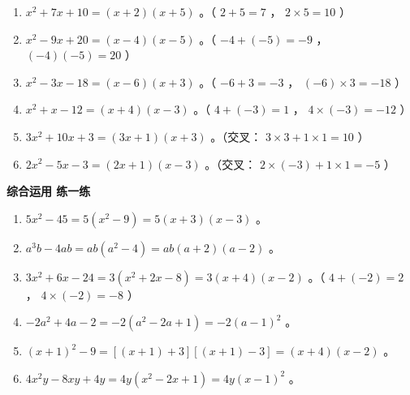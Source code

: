 \begin{answer}
\begin{enumerate}
  \item $x^2 + 7x + 10 = (x + 2)(x + 5)$ 。（ $2 + 5 = 7$ ， $2 \times 5 = 10$ ）
  \item $x^2 - 9x + 20 = (x - 4)(x - 5)$ 。（ $-4 + (-5) = -9$ ， $(-4)(-5) = 20$ ）
  \item $x^2 - 3x - 18 = (x - 6)(x + 3)$ 。（ $-6 + 3 = -3$ ， $(-6) \times 3 = -18$ ）
  \item $x^2 + x - 12 = (x + 4)(x - 3)$ 。（ $4 + (-3) = 1$ ， $4 \times (-3) = -12$ ）
  \item $3x^2 + 10x + 3 = (3x + 1)(x + 3)$ 。（交叉： $3 \times 3 + 1 \times 1 = 10$ ）
  \item $2x^2 - 5x - 3 = (2x + 1)(x - 3)$ 。（交叉： $2 \times (-3) + 1 \times 1 = -5$ ）
\end{enumerate}


\textbf{综合运用 练一练}

\begin{enumerate}
  \item $5x^2 - 45 = 5(x^2 - 9) = 5(x + 3)(x - 3)$ 。
  \item $a^3b - 4ab = ab(a^2 - 4) = ab(a + 2)(a - 2)$ 。
  \item $3x^2 + 6x - 24 = 3(x^2 + 2x - 8) = 3(x + 4)(x - 2)$ 。（ $4 + (-2) = 2$ ， $4 \times (-2) = -8$ ）
  \item $-2a^2 + 4a - 2 = -2(a^2 - 2a + 1) = -2(a - 1)^2$ 。
  \item $(x + 1)^2 - 9 = [(x + 1) + 3][(x + 1) - 3] = (x + 4)(x - 2)$ 。
  \item $4x^2y - 8xy + 4y = 4y(x^2 - 2x + 1) = 4y(x - 1)^2$ 。
\end{enumerate}


\end{answer}
